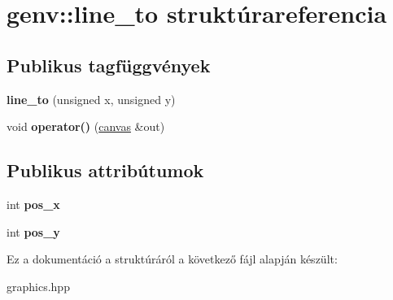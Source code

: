 \hypertarget{structgenv_1_1line__to}{}\section{genv\+:\+:line\+\_\+to struktúrareferencia}
\label{structgenv_1_1line__to}
\subsection*{Publikus tagfüggvények}
\begin{DoxyCompactItemize}
\item 
\mbox{\label{structgenv_1_1line__to_ad4542f2b1357a1d357c545682d2ba789}} 
{\bfseries line\+\_\+to} (unsigned x, unsigned y)
\item 
\mbox{\label{structgenv_1_1line__to_ad259d328a81ecb6a4558fa1d2566ef52}} 
void {\bfseries operator()} (\hyperlink{classgenv_1_1canvas}{canvas} \&out)
\end{DoxyCompactItemize}
\subsection*{Publikus attribútumok}
\begin{DoxyCompactItemize}
\item 
\mbox{\label{structgenv_1_1line__to_add7d097d37d289d5a8edc9204e129bd5}} 
int {\bfseries pos\+\_\+x}
\item 
\mbox{\label{structgenv_1_1line__to_a30ebc3a8b9f60695f96aad5da4e24a86}} 
int {\bfseries pos\+\_\+y}
\end{DoxyCompactItemize}


Ez a dokumentáció a struktúráról a következő fájl alapján készült\+:\begin{DoxyCompactItemize}
\item 
graphics.\+hpp\end{DoxyCompactItemize}
